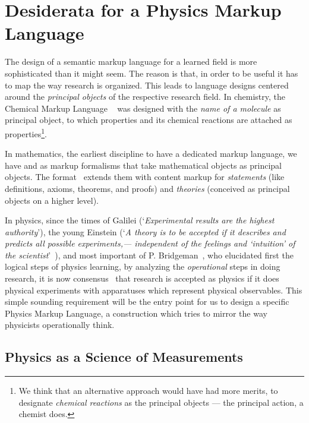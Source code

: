 \section{Desiderata for a Physics Markup Language}\label{sec:physml}

The design of a semantic markup language for a learned field is more sophisticated than it
might seem.  The reason is that, in order to be useful it has to map the way research is
organized. This leads to language designs centered around the {\emph{principal objects}}
of the respective research field. In chemistry, the Chemical Markup Language
{\chemml}~\cite{CML:web} was designed with the {\emph{name of a molecule}} as principal
object, to which properties and its chemical reactions are attached as
properties\footnote{We think that an alternative approach would have had more merits, to
  designate {\emph{chemical reactions}} as the principal objects --- the principal action,
  a chemist does.}.

In mathematics, the earliest discipline to have a dedicated markup language, we have
{\mathml} and {\openmath} as markup formalisms that take mathema\-tical objects as
principal objects. The {\omdoc} format~\cite{Kohlhase:omdoc1.2} extends them with content
markup for {\emph{statements}} (like definitions, axioms, theorems, and proofs) and
{\emph{theories}} (conceived as principal objects on a higher level).

In physics, since the times of Galilei (`\emph{Experimental results are the highest
  authority}'), the young Einstein (`\emph{A theory is to be accepted if it describes and
  predicts all possible experiments,--- independent of the feelings and `intuition' of the
  scientist}'~\cite{Born:einstein}), and most important of P.
Bridgeman~\cite{Hilf:bridgeman}, who elucidated first the logical steps of physics
learning, by analyzing the {\emph{operational}} steps in doing research, it is now
consensus~\cite{Mittelstaedt:buch,Falk:thermodyn,Falk:mechanik,Sakurai} that research is
accepted as physics if it does physical experiments with apparatuses which represent
physical observables.  This simple sounding requirement will be the entry point for us to
design a specific Physics Markup Language, a construction which tries to mirror the way
physicists operationally think.

\subsection{Physics as a Science of Measurements}

